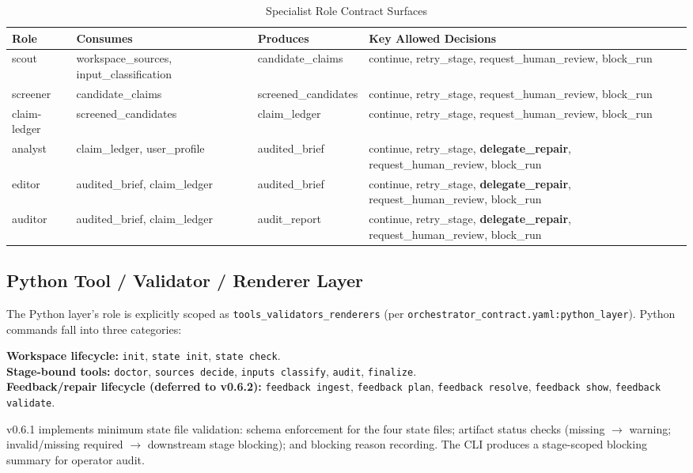\documentclass[11pt,a4paper]{article}
\begin{document}
\begin{table}[ht]
\centering
\caption{Specialist Role Contract Surfaces}
\label{tab:role-contracts}
\footnotesize
\begin{tabular}{@{}llll@{}}
\toprule
\textbf{Role} & \textbf{Consumes} & \textbf{Produces} & \textbf{Key Allowed Decisions} \\
\midrule
scout & workspace\_sources, input\_classification & candidate\_claims & continue, retry\_stage, request\_human\_review, block\_run \\
screener & candidate\_claims & screened\_candidates & continue, retry\_stage, request\_human\_review, block\_run \\
claim-ledger & screened\_candidates & claim\_ledger & continue, retry\_stage, request\_human\_review, block\_run \\
analyst & claim\_ledger, user\_profile & audited\_brief & continue, retry\_stage, \textbf{delegate\_repair}, request\_human\_review, block\_run \\
editor & audited\_brief, claim\_ledger & audited\_brief & continue, retry\_stage, \textbf{delegate\_repair}, request\_human\_review, block\_run \\
auditor & audited\_brief, claim\_ledger & audit\_report & continue, retry\_stage, \textbf{delegate\_repair}, request\_human\_review, block\_run \\
\bottomrule
\end{tabular}
\end{table}

\subsection{Python Tool / Validator / Renderer Layer}

The Python layer's role is explicitly scoped as \texttt{tools\_validators\_renderers} (per \texttt{orchestrator\_contract.yaml:python\_layer}). Python commands fall into three categories:

\textbf{Workspace lifecycle:} \texttt{init}, \texttt{state init}, \texttt{state check}.\\
\textbf{Stage-bound tools:} \texttt{doctor}, \texttt{sources decide}, \texttt{inputs classify}, \texttt{audit}, \texttt{finalize}.\\
\textbf{Feedback/repair lifecycle (deferred to v0.6.2):} \texttt{feedback ingest}, \texttt{feedback plan}, \texttt{feedback resolve}, \texttt{feedback show}, \texttt{feedback validate}.

v0.6.1 implements minimum state file validation: schema enforcement for the four state files; artifact status checks (missing $\rightarrow$ warning; invalid/missing required $\rightarrow$ downstream stage blocking); and blocking reason recording. The CLI produces a stage-scoped blocking summary for operator audit.
\end{document}
